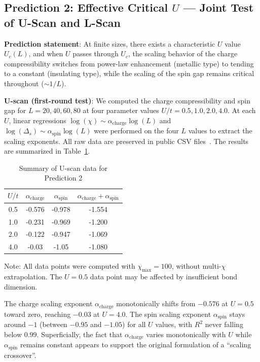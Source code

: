\documentclass[prb,reprint,twocolumn,superscriptaddress]{revtex4-2}
\begin{document}
\subsection{Prediction 2: Effective Critical $U$ --- Joint Test of U-Scan and L-Scan}

\textbf{Prediction statement}: At finite sizes, there exists a characteristic $U$ value $U_c(L)$, and when $U$ passes through $U_c$, the scaling behavior of the charge compressibility switches from power-law enhancement (metallic type) to tending to a constant (insulating type), while the scaling of the spin gap remains critical throughout ($\sim 1/L$).

\textbf{U-scan (first-round test)}: We computed the charge compressibility and spin gap for $L = 20, 40, 60, 80$ at four parameter values $U/t = 0.5, 1.0, 2.0, 4.0$. At each $U$, linear regressions $\log(\chi) \sim \alpha_{\mathrm{charge}} \log(L)$ and $\log(\Delta_s) \sim \alpha_{\mathrm{spin}} \log(L)$ were performed on the four $L$ values to extract the scaling exponents. All raw data are preserved in public CSV files~\cite{Li2026GitHub}. The results are summarized in Table~\ref{tab:U_scan}.

\begin{table}[htbp]
\caption{Summary of U-scan data for Prediction 2}
\label{tab:U_scan}
\begin{tabular}{cccc}
\toprule
$U/t$ & $\alpha_{\mathrm{charge}}$ & $\alpha_{\mathrm{spin}}$ & $\alpha_{\mathrm{charge}} + \alpha_{\mathrm{spin}}$ \\
\midrule
0.5 & -0.576 & -0.978 & -1.554 \\
1.0 & -0.231 & -0.969 & -1.200 \\
2.0 & -0.122 & -0.947 & -1.069 \\
4.0 & -0.03 & -1.05 & -1.080 \\
\bottomrule
\end{tabular}
\par
\smallskip
\small Note: All data points were computed with $\chi_{\max} = 100$, without multi-$\chi$ extrapolation. The $U = 0.5$ data point may be affected by insufficient bond dimension.
\end{table}

The charge scaling exponent $\alpha_{\mathrm{charge}}$ monotonically shifts from $-0.576$ at $U = 0.5$ toward zero, reaching $-0.03$ at $U = 4.0$. The spin scaling exponent $\alpha_{\mathrm{spin}}$ stays around $-1$ (between $-0.95$ and $-1.05$) for all $U$ values, with $R^2$ never falling below $0.99$. Superficially, the fact that $\alpha_{\mathrm{charge}}$ varies monotonically with $U$ while $\alpha_{\mathrm{spin}}$ remains constant appears to support the original formulation of a ``scaling crossover''.
\end{document}
